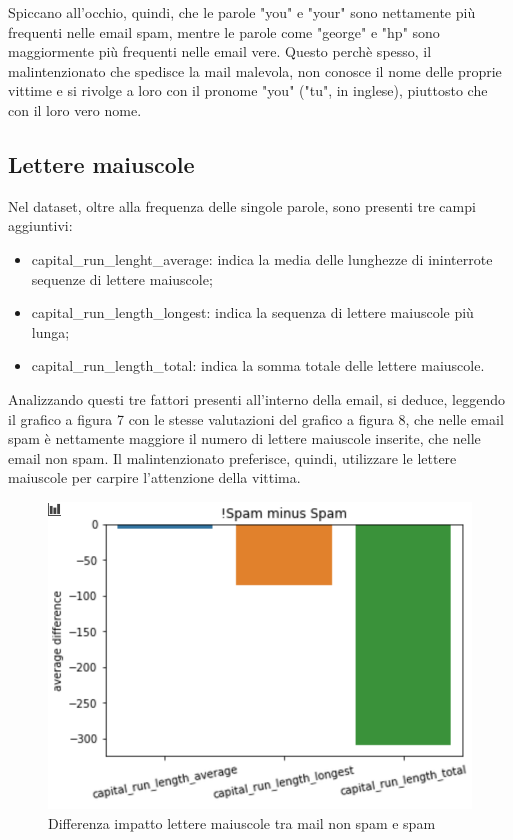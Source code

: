 \documentclass[12pt,a4paper]{article}
\begin{document}
Spiccano all'occhio, quindi, che le parole "you" e "your" sono nettamente più frequenti nelle email spam, mentre le parole come "george" e "hp" sono maggiormente più frequenti nelle email vere. Questo perchè spesso, il malintenzionato che spedisce la mail malevola, non conosce il nome delle proprie vittime e si rivolge a loro con il pronome "you" ("tu", in inglese), piuttosto che con il loro vero nome.
\subsection{Lettere maiuscole}
Nel dataset, oltre alla frequenza delle singole parole, sono presenti tre campi aggiuntivi:
\begin{itemize}
    \item capital\_run\_lenght\_average: indica la media delle lunghezze di ininterrote sequenze di lettere maiuscole;
    \item capital\_run\_length\_longest: indica la sequenza di lettere maiuscole più lunga;
    \item capital\_run\_length\_total: indica la somma totale delle lettere maiuscole.
\end{itemize}

Analizzando questi tre fattori presenti all'interno della email, si deduce, leggendo il grafico a figura 7 con le stesse valutazioni del grafico a figura 8, che nelle email spam è nettamente maggiore il numero di lettere maiuscole inserite, che nelle email non spam.
Il malintenzionato preferisce, quindi, utilizzare le lettere maiuscole per carpire l'attenzione della vittima.

\begin{figure}[H]
    \centering
    \includegraphics[width=.7\columnwidth]{capital_plot.png}
    \caption{Differenza impatto lettere maiuscole tra mail non spam e spam }
\end{figure}
\end{document}
